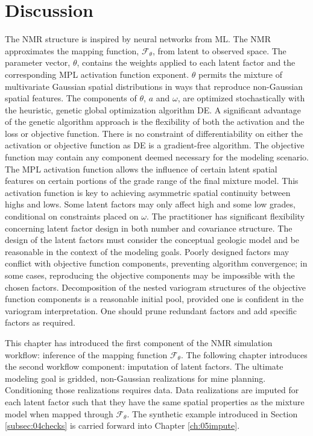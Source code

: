 \FloatBarrier
\section{Discussion}
\label{sec:04discuss}

The \gls{NMR} structure is inspired by neural networks from \gls{ML}. The \gls{NMR} approximates the mapping function, $\mathcal{F}_{\theta}$, from latent to observed space. The parameter vector, $\theta$, contains the weights applied to each latent factor and the corresponding \gls{MPL} activation function exponent. $\theta$ permits the mixture of multivariate Gaussian spatial distributions in ways that reproduce non-Gaussian spatial features. The components of $\theta$, $a$ and $\omega$, are optimized stochastically with the heuristic, genetic global optimization algorithm \gls{DE}. A significant advantage of the genetic algorithm approach is the flexibility of both the activation and the loss or objective function. There is no constraint of differentiability on either the activation or objective function as \Gls{DE} is a gradient-free algorithm. The objective function may contain any component deemed necessary for the modeling scenario. The \gls{MPL} activation function allows the influence of certain latent spatial features on certain portions of the grade range of the final mixture model. This activation function is key to achieving asymmetric spatial continuity between highs and lows. Some latent factors may only affect high and some low grades, conditional on constraints placed on $\omega$. The practitioner has significant flexibility concerning latent factor design in both number and covariance structure. The design of the latent factors must consider the conceptual geologic model and be reasonable in the context of the modeling goals. Poorly designed factors may conflict with objective function components, preventing algorithm convergence; in some cases, reproducing the objective components may be impossible with the chosen factors. Decomposition of the nested variogram structures of the objective function components is a reasonable initial pool, provided one is confident in the variogram interpretation. One should prune redundant factors and add specific factors as required.

This chapter has introduced the first component of the \gls{NMR} simulation workflow: inference of the mapping function $\mathcal{F}_{\theta}$. The following chapter introduces the second workflow component: imputation of latent factors. The ultimate modeling goal is gridded, non-Gaussian realizations for mine planning. Conditioning those realizations requires data. Data realizations are imputed for each latent factor such that they have the same spatial properties as the mixture model when mapped through $\mathcal{F}_{\theta}$. The synthetic example introduced in Section \ref{subsec:04checks} is carried forward into Chapter \ref{ch:05impute}.